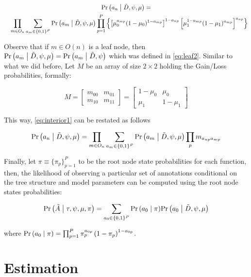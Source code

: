 \documentclass[12pt]{article}
\newcommand{\Prcond}[2]{{\mbox{Pr}\left(#1\;\vphantom{#2}\right|\left.\vphantom{#1}#2\right) }}
\begin{document}
\begin{multline} 
\label{eq:interior1}
\Prcond{a_n}{\tilde D, \psi,\mu} =  \\
\quad\prod_{m \in O_n} \sum_{a_m \in \{0,1\}^P} \Prcond{a_m}{\tilde D, \psi,\mu}
\prod_{p = 1}^P \left\{\left[\mu_0^{a_{mp}}(1-\mu_0)^{1 - a_{mp}}\right]^{1 - a_{np}}
  \left[\mu_1^{1 - a_{mp}}(1-\mu_1)^{a_{mp}}\right]^{a_{np}}\right\} 
\end{multline}

Observe that if $m\in O(n)$ is a leaf node, then $\Prcond{a_m}{\tilde D, \psi,\mu} = \Prcond{a_m}{\tilde D, \psi}$ which was defined in \eqref{eq:leaf2}. Similar to what we did before, Let $M$ be an array of size $2\times 2$ holding the Gain/Loss probabilities, formally: 

$$
M = \left[\begin{array}{cc}
m_{00} & m_{01} \\
m_{10} & m_{11}
\end{array}\right]
= \left[\begin{array}{cc}
1-\mu_0 & \mu_0 \\
\mu_1 & 1 - \mu_1
\end{array}\right]
$$

This way, \eqref{eq:interior1} can be restated as follows

\begin{equation}
\label{eq:interior2}
\Prcond{a_n}{\tilde D, \psi,\mu} = \prod_{m \in O_n} \sum_{a_m \in \{0,1\}^P} \Prcond{a_m}{\tilde D, \psi,\mu}
\prod_p m_{a_{np}a_{mp}}
\end{equation}

Finally, let $\pi\equiv\{\pi_p\}_{p=1}^{P}$ to be the root node state probabilities for each function, then, the likelihood of observing a particular set of annotations conditional on the tree structure and model parameters can be computed using the root node states probabilities:

\begin{equation}
\label{eq:ll}
\Prcond{\tilde A}{\tau,\psi, \mu, \pi} = \sum_{a_0 \in \{0,1\}^P} \Prcond{a_0}{\pi} \Prcond{a_0}{\tilde D,\psi,\mu}
\end{equation}

where $\Prcond{a_0}{\pi} = \prod_{p=1}^P \pi_p^{a_{0p}}\left(1 - \pi_p\right)^{1 - a_{0p}}$.

\section{Estimation}
\end{document}
